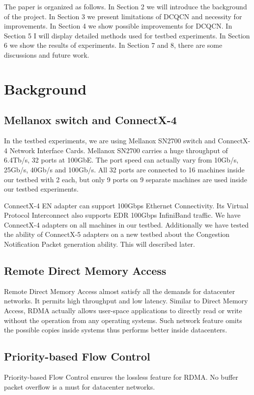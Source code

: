 \documentclass[12pt,a4paper]{article}
\begin{document}
The paper is organized as follows.
In Section 2 we will introduce the background of the project.
In Section 3 we present limitations of DCQCN and necessity for improvements.
In Section 4 we show possible improvements for DCQCN.
In Section 5 I will display detailed methods used for testbed experiments.
In Section 6 we show the results of experiments.
In Section 7 and 8, there are some discussions and future work.

\section{Background}
\subsection{Mellanox switch and ConnectX-4}
In the testbed experiments, we are using Mellanox SN2700 switch and ConnectX-4 Network Interface Cards.
Mellanox SN2700 carries a huge throughput of 6.4Tb/s, 32 ports at 100GbE.
The port speed can actually vary from 10Gb/s, 25Gb/s, 40Gb/s and 100Gb/s.
All 32 ports are connected to 16 machines inside our testbed with 2 each, but only 9 ports on 9 separate machines are used inside our
testbed experiments.

ConnectX-4 EN adapter can support 100Gbps Ethernet Connectivity.
Its Virtual Protocol Interconnect also supports EDR 100Gbps InfiniBand traffic.
We have ConnectX-4 adapters on all machines in our testbed.
Additionally we have tested the ability of ConnectX-5 adapters on a new testbed about the Congestion Notification Packet generation
ability.
This will described later.

\subsection{Remote Direct Memory Access}
Remote Direct Memory Access almost satisfy all the demands for datacenter networks.
It permits high throughput and low latency.
Similar to Direct Memory Access, RDMA actually allows user-space applications to directly read or write without the operation from
any operating systems.
Such network feature omits the possible copies inside systems thus performs better inside datacenters.

\subsection{Priority-based Flow Control}
Priority-based Flow Control ensures the lossless feature for RDMA.
No buffer packet overflow is a must for datacenter networks.
\end{document}
